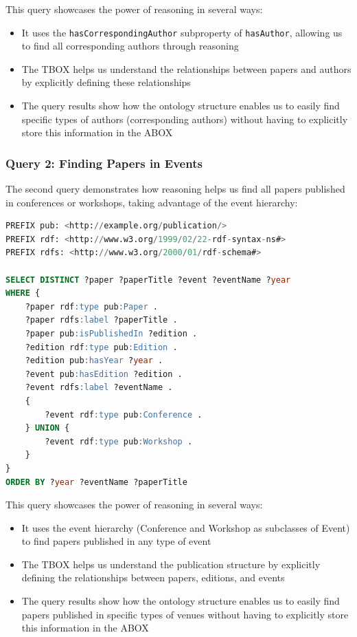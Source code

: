 \documentclass[10pt,a4paper]{article}
\begin{document}
This query showcases the power of reasoning in several ways:
\begin{itemize}
    \item It uses the \texttt{hasCorrespondingAuthor} subproperty of \texttt{hasAuthor}, allowing us to find all corresponding authors through reasoning
    \item The TBOX helps us understand the relationships between papers and authors by explicitly defining these relationships
    \item The query results show how the ontology structure enables us to easily find specific types of authors (corresponding authors) without having to explicitly store this information in the ABOX
\end{itemize}

\subsubsection{Query 2: Finding Papers in Events}

The second query demonstrates how reasoning helps us find all papers published in conferences or workshops, taking advantage of the event hierarchy:

\begin{lstlisting}[language=SQL]
PREFIX pub: <http://example.org/publication/>
PREFIX rdf: <http://www.w3.org/1999/02/22-rdf-syntax-ns#>
PREFIX rdfs: <http://www.w3.org/2000/01/rdf-schema#>

SELECT DISTINCT ?paper ?paperTitle ?event ?eventName ?year
WHERE {
    ?paper rdf:type pub:Paper .
    ?paper rdfs:label ?paperTitle .
    ?paper pub:isPublishedIn ?edition .
    ?edition rdf:type pub:Edition .
    ?edition pub:hasYear ?year .
    ?event pub:hasEdition ?edition .
    ?event rdfs:label ?eventName .
    {
        ?event rdf:type pub:Conference .
    } UNION {
        ?event rdf:type pub:Workshop .
    }
}
ORDER BY ?year ?eventName ?paperTitle
\end{lstlisting}

This query showcases the power of reasoning in several ways:
\begin{itemize}
    \item It uses the event hierarchy (Conference and Workshop as subclasses of Event) to find papers published in any type of event
    \item The TBOX helps us understand the publication structure by explicitly defining the relationships between papers, editions, and events
    \item The query results show how the ontology structure enables us to easily find papers published in specific types of venues without having to explicitly store this information in the ABOX
\end{itemize}
\end{document}
